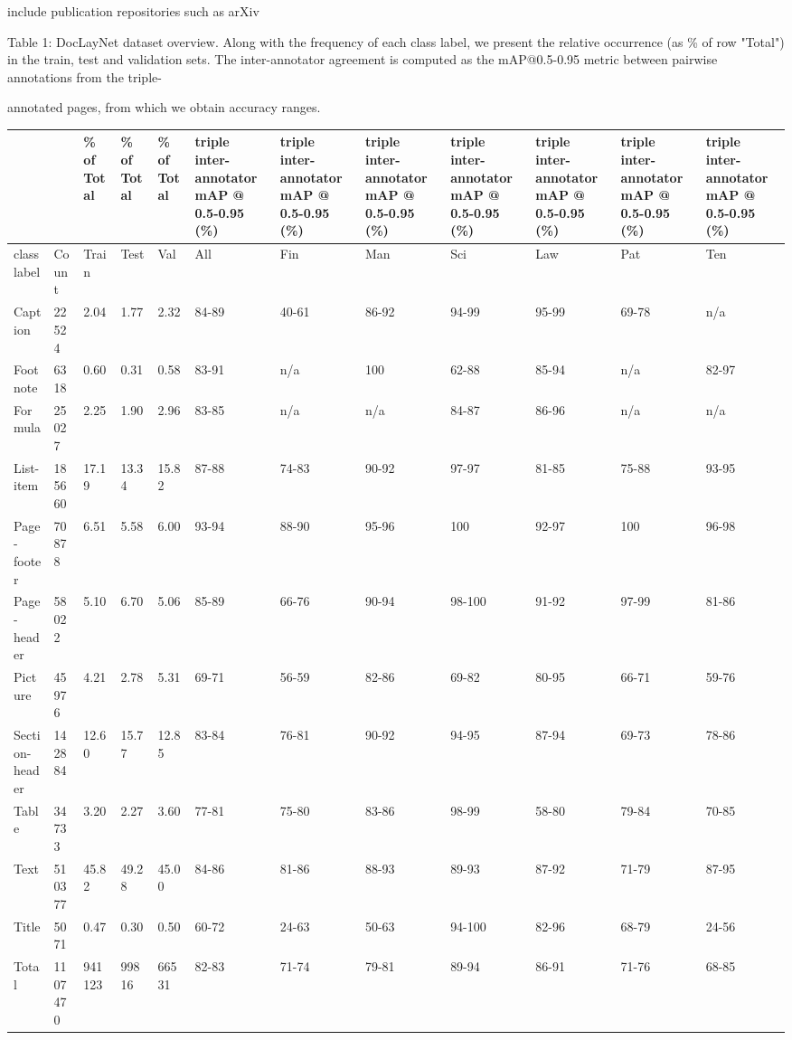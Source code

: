 \documentclass[11pt,a4paper]{article}
\begin{document}
include publication repositories such as arXiv

Table 1: DocLayNet dataset overview. Along with the frequency of each class label, we present the relative occurrence (as \% of row "Total") in the train, test and validation sets. The inter-annotator agreement is computed as the mAP@0.5-0.95 metric between pairwise annotations from the triple-

annotated pages, from which we obtain accuracy ranges.

\begin{figure}[h]
\end{figure}

\begin{table}[h]
\begin{tabular}{|l|l|l|l|l|l|l|l|l|l|l|l|}
\hline
 &  & \% of Total & \% of Total & \% of Total & triple inter- annotator mAP @ 0.5-0.95 (\%) & triple inter- annotator mAP @ 0.5-0.95 (\%) & triple inter- annotator mAP @ 0.5-0.95 (\%) & triple inter- annotator mAP @ 0.5-0.95 (\%) & triple inter- annotator mAP @ 0.5-0.95 (\%) & triple inter- annotator mAP @ 0.5-0.95 (\%) & triple inter- annotator mAP @ 0.5-0.95 (\%) \\ \hline
class label & Count & Train & Test & Val & All & Fin & Man & Sci & Law & Pat & Ten \\ \hline
Caption & 22524 & 2.04 & 1.77 & 2.32 & 84-89 & 40-61 & 86-92 & 94-99 & 95-99 & 69-78 & n/a \\ \hline
Footnote & 6318 & 0.60 & 0.31 & 0.58 & 83-91 & n/a & 100 & 62-88 & 85-94 & n/a & 82-97 \\ \hline
Formula & 25027 & 2.25 & 1.90 & 2.96 & 83-85 & n/a & n/a & 84-87 & 86-96 & n/a & n/a \\ \hline
List-item & 185660 & 17.19 & 13.34 & 15.82 & 87-88 & 74-83 & 90-92 & 97-97 & 81-85 & 75-88 & 93-95 \\ \hline
Page- footer & 70878 & 6.51 & 5.58 & 6.00 & 93-94 & 88-90 & 95-96 & 100 & 92-97 & 100 & 96-98 \\ \hline
Page- header & 58022 & 5.10 & 6.70 & 5.06 & 85-89 & 66-76 & 90-94 & 98-100 & 91-92 & 97-99 & 81-86 \\ \hline
Picture & 45976 & 4.21 & 2.78 & 5.31 & 69-71 & 56-59 & 82-86 & 69-82 & 80-95 & 66-71 & 59-76 \\ \hline
Section- header & 142884 & 12.60 & 15.77 & 12.85 & 83-84 & 76-81 & 90-92 & 94-95 & 87-94 & 69-73 & 78-86 \\ \hline
Table & 34733 & 3.20 & 2.27 & 3.60 & 77-81 & 75-80 & 83-86 & 98-99 & 58-80 & 79-84 & 70-85 \\ \hline
Text & 510377 & 45.82 & 49.28 & 45.00 & 84-86 & 81-86 & 88-93 & 89-93 & 87-92 & 71-79 & 87-95 \\ \hline
Title & 5071 & 0.47 & 0.30 & 0.50 & 60-72 & 24-63 & 50-63 & 94-100 & 82-96 & 68-79 & 24-56 \\ \hline
Total & 1107470 & 941123 & 99816 & 66531 & 82-83 & 71-74 & 79-81 & 89-94 & 86-91 & 71-76 & 68-85 \\ \hline
\end{tabular}
\end{table}
\end{document}
